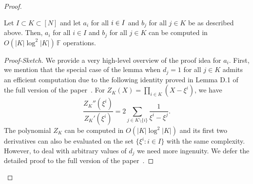 \begin{proof}
    \begin{lemma}\label{lem:sum-computation}
    Let $I\subset K\subset [N]$ and let $a_i$ for all $i \in I$ and $b_j$ for all $j \in K$ be as described above.
    Then, $a_i$ for all $i \in I$ and $b_j$ for all $j \in K$ can be computed in $O(|K|\log^2|K|)\, \mathbb{F}$ operations.
    \end{lemma}
    \begin{proof}[Proof-Sketch]
        We provide a very high-level overview of the proof idea for $a_i$.
        First, we mention that the special case of the lemma when $d_j=1$ for all $j\in K$ admits an efficient computation due to the following identity
        proved in Lemma D.1 of the full version of the paper~\cite{full-ver}. For $Z_K(X)=\prod_{i\in K}(X-\xi^i)$, we have
        \begin{equation*}
            \frac{Z_K''(\xi^i)}{Z_K'(\xi^i)} = 2\sum_{j\in K\setminus \{i\}}\frac{1}{\xi^i-\xi^j}.
        \end{equation*}
        The polynomial $Z_K$ can be computed in $O(|K|\log^2|K|)$ and its first two
        derivatives can also be evaluated on the set $\{\xi^i: i\in I\}$ with the same complexity. However, to deal with arbitrary values of $d_j$ we
        need more ingenuity. %
        We defer the detailed proof to the full version of the paper~\cite{full-ver}. 

\end{proof}
\end{proof}

